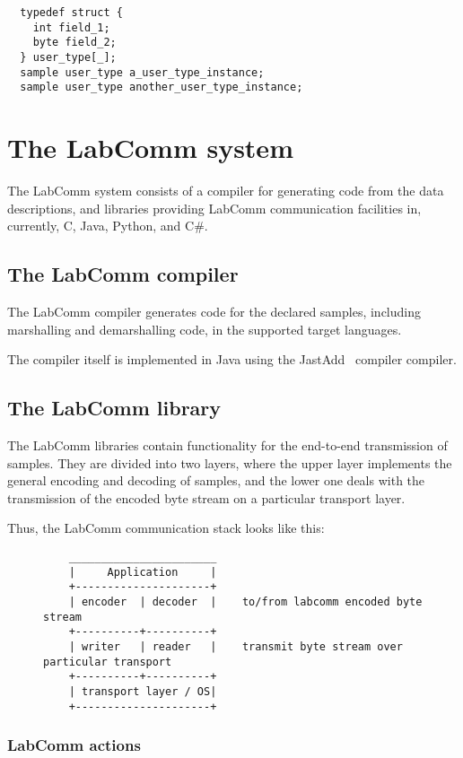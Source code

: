 \documentclass[a4paper]{article}
\begin{document}
\begin{verbatim}
  typedef struct {
    int field_1;
    byte field_2;
  } user_type[_];
  sample user_type a_user_type_instance;
  sample user_type another_user_type_instance;
\end{verbatim}

\section{The LabComm system}

The LabComm system consists of a compiler for generating code from the data
descriptions, and libraries providing LabComm communication facilities in,
currently, C, Java, Python, and C\#.


\subsection{The LabComm compiler}

The LabComm compiler generates code for the declared samples, including marshalling and
demarshalling code, in the supported target languages.

The compiler itself is implemented in Java using the JastAdd~\cite{jastadd} compiler compiler.
\pagebreak
\subsection{The LabComm library}

The LabComm libraries contain functionality for the end-to-end transmission
of samples. They are divided into two layers, where the upper layer implements
the general encoding and decoding of samples, and the lower one deals with 
the transmission of the encoded byte stream on a particular transport layer.

Thus, the LabComm communication stack looks like this:
\begin{figure}[h!]
\begin{verbatim}
    _______________________
    |     Application     |
    +---------------------+
    | encoder  | decoder  |    to/from labcomm encoded byte stream
    +----------+----------+
    | writer   | reader   |    transmit byte stream over particular transport
    +----------+----------+
    | transport layer / OS|
    +---------------------+
\end{verbatim}
\end{figure}
\subsubsection{LabComm actions}
\end{document}
